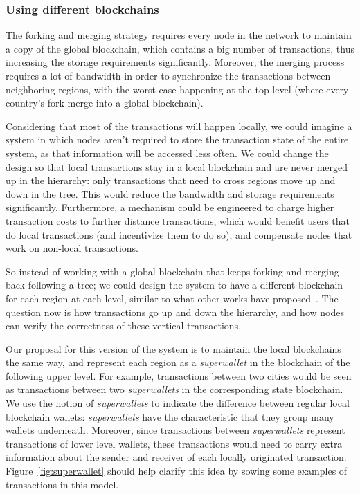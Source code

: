 \subsubsection{Using different blockchains}

The forking and merging strategy requires every node in the network to maintain
a copy of the global blockchain, which contains a big number of transactions,
thus increasing the storage requirements significantly.  Moreover, the merging
process requires a lot of bandwidth in order to synchronize the transactions
between neighboring regions, with the worst case happening at the top level
(where every country's fork merge into a global blockchain).

Considering that most of the transactions will happen locally, we could imagine
a system in which nodes aren't required to store the transaction state of the
entire system, as that information will be accessed less often.  We could
change the design so that local transactions stay in a local blockchain and are
never merged up in the hierarchy: only transactions that need to cross regions
move up and down in the tree.  This would reduce the bandwidth and storage
requirements significantly.  Furthermore, a mechanism could be engineered to
charge higher transaction costs to further distance transactions, which would
benefit users that do local transactions (and incentivize them to do so), and
compensate nodes that work on non-local transactions.

So instead of working with a global blockchain that keeps forking and merging
back following a tree; we could design the system to have a different
blockchain for each region at each level, similar to what other works have
proposed~\cite{unchain}.  The question now is how transactions go up and down
the hierarchy, and how nodes can verify the correctness of these vertical
transactions.

Our proposal for this version of the system is to maintain the local
blockchains the same way, and represent each region as a \textit{superwallet}
in the blockchain of the following upper level.  For example, transactions
between two cities would be seen as transactions between two
\textit{superwallets} in the corresponding state blockchain.  We use the notion
of \textit{superwallets} to indicate the difference between regular local
blockchain wallets: \textit{superwallets} have the characteristic that they
group many wallets underneath.  Moreover, since transactions between
\textit{superwallets} represent transactions of lower level wallets, these
transactions would need to carry extra information about the sender and
receiver of each locally originated transaction.  Figure~\ref{fig:superwallet}
should help clarify this idea by sowing some examples of transactions in
this model.

